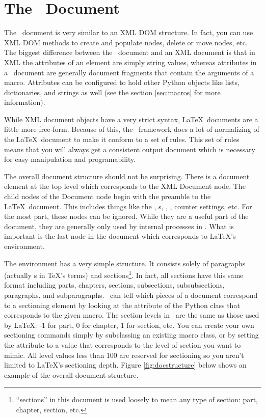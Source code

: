 
\chapter{The \plasTeX\ Document\label{sec:document}}

The \plasTeX\ document is very similar to an XML DOM structure.  In fact,
you can use XML DOM methods to create and populate nodes, delete or move
nodes, etc.  The biggest difference between the \plasTeX\ document and
an XML document is that in XML the attributes of an element are simply 
string values, whereas attributes in a \plasTeX\ document are generally 
document fragments that contain the arguments of a macro.  Attributes can
be configured to hold other Python objects like lists, dictionaries, and
strings as well (see the section \ref{sec:macros} for more information).

While XML document objects have a very strict syntax, \LaTeX\ documents
are a little more free-form.  Because of this, the \plasTeX\ framework
does a lot of normalizing of the \LaTeX\ document to make it conform to
a set of rules.  This set of rules means that you will always get a 
consistent output document which is necessary for easy manipulation and
programability.

The overall document structure should not be surprising.  There is a 
document element at the top level which corresponds to the XML Document
node.  The child nodes of the Document node begin with the preamble to 
the \LaTeX\ document.  This includes things like the ,
s, , , counter settings, etc.
For the most part, these nodes can be ignored.  While they are a useful
part of the document, they are generally only used by internal processes
in \plasTeX.  What is important is the last node in the document which
corresponds to \LaTeX's  environment.

The  environment has a very simple structure.  
It consists solely of paragraphs (actually s in \TeX's terms) 
and sections\footnote{``sections'' in
this document is used loosely to mean any type of section: part, chapter, 
section, etc.}.  In fact, all sections have this same format including
parts, chapters, sections, subsections, subsubsections, paragraphs, and
subparagraphs.  \plasTeX\ can tell which pieces of a document correspond
to a sectioning element by looking at the  attribute of the
Python class that corresponds to the given macro.  The section levels in
\plasTeX\ are the same as those used by \LaTeX: -1 for part, 0 for chapter,
1 for section, etc.  You can create your own sectioning commands simply
by subclassing an existing macro class, or by setting the 
attribute to a value that corresponds to the level of section you want
to mimic.  All level values less than 100 are reserved for sectioning so
you aren't limited to \LaTeX's sectioning depth.  Figure \ref{fig:docstructure} 
below shows an example of the overall document structure.

